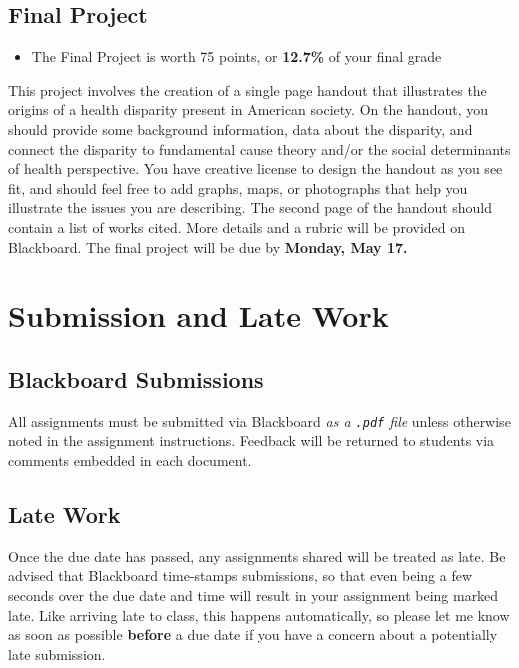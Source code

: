 \documentclass[
]{book}
\newenvironment{rmdblock}[1]
  {\begin{shaded*}
  \begin{itemize}
  \renewcommand{\labelitemi}{
    \raisebox{-.7\height}[0pt][0pt]{
      {\setkeys{Gin}{width=3em,keepaspectratio}\texttt{[image: images/\#1]}}
    }
  }
  \item
  }
  {
  \end{itemize}
  \end{shaded*}
  }
\newenvironment{rmdtip}
  {\begin{rmdblock}{tip}}
  {\end{rmdblock}}
\begin{document}
\hypertarget{final-project}{%
\subsection{Final Project}\label{final-project}}

\begin{rmdtip}
The Final Project is worth 75 points, or \textbf{12.7\%} of your final
grade
\end{rmdtip}

This project involves the creation of a single page handout that illustrates the origins of a health disparity present in American society. On the handout, you should provide some background information, data about the disparity, and connect the disparity to fundamental cause theory and/or the social determinants of health perspective. You have creative license to design the handout as you see fit, and should feel free to add graphs, maps, or photographs that help you illustrate the issues you are describing. The second page of the handout should contain a list of works cited. More details and a rubric will be provided on Blackboard. The final project will be due by \textbf{Monday, May 17.}

\hypertarget{submission-and-late-work}{%
\section{Submission and Late Work}\label{submission-and-late-work}}

\hypertarget{blackboard-submissions}{%
\subsection{Blackboard Submissions}\label{blackboard-submissions}}

All assignments must be submitted via Blackboard \emph{as a \texttt{.pdf} file} unless otherwise noted in the assignment instructions. Feedback will be returned to students via comments embedded in each document.

\hypertarget{late-work}{%
\subsection{Late Work}\label{late-work}}

Once the due date has passed, any assignments shared will be treated as late. Be advised that Blackboard time-stamps submissions, so that even being a few seconds over the due date and time will result in your assignment being marked late. Like arriving late to class, this happens automatically, so please let me know as soon as possible \textbf{before} a due date if you have a concern about a potentially late submission.
\end{document}
